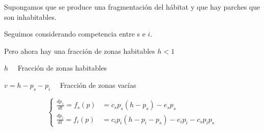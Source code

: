 \documentclass[twocolumn,aps,prl]{revtex4-1}
\begin{document}







Supongamos que se produce una fragmentación del hábitat y que hay parches que son inhabitables. 

Seguimos considerando competencia entre s e $i$. 

Pero ahora hay una fracción de zonas habitables $h<1$ 

$h \quad$ Fracción de zonas habitables 

$v=h-p_{s}-p_{i} \quad$ Fracción de zonas vacías 

$$
\left\{ 
    \begin{aligned}
        \frac{d p_{s}}{d t} = f_{s}(p) &= c_{s} p_{s}\left(h-p_{s}\right)-e_{s} p_{s} \\
        \frac{d p_{i}}{d t} = f_{i}(p) &= c_{i} p_{i}\left(h-p_{i}-p_{s}\right)-e_{i} p_{i}-c_{s} p_{i} p_{s}
    \end{aligned}
\right.
$$
\end{document}
